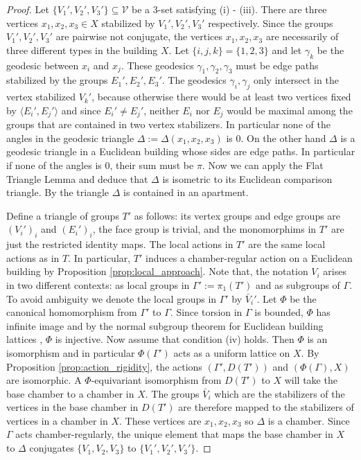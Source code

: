 \documentclass[dvipsnames]{article}
\theoremstyle{definition}
\theoremstyle{remark}
\begin{document}
    \begin{proof}        
        Let $\{V_1', V_2', V_3'\} \subseteq \mathcal V$ be a 3-set satisfying (i) - (iii).
        There are three vertices $x_1, x_2, x_3 \in X$ stabilized by $V_1', V_2', V_3'$ respectively.
        Since the groups $V_1', V_2', V_3'$ are pairwise not conjugate, the vertices $x_1, x_2, x_3$ are necessarily of three different types in the building $X$.
        Let $\{i,j,k\} = \{1,2,3\}$ and let $\gamma_k$ be the geodesic between $x_i$ and $x_j$.
        These geodesics $\gamma_1, \gamma_2, \gamma_3$ must be edge paths stabilized by the groups $E_1', E_2', E_3'$.
        The geodesics $\gamma_i, \gamma_j$ only intersect in the vertex stabilized $V_k'$, because otherwise there would be at least two vertices fixed by $\langle E_i', E_j'\rangle$ and since $E_i' \neq E_j'$, neither $E_i$ nor $E_j$ would be maximal among the groups that are contained in two vertex stabilizers.
        In particular none of the angles in the geodesic triangle $\Delta := \Delta(x_1, x_2, x_3)$ is 0.
        On the other hand $\Delta$ is a geodesic triangle in a Euclidean building whose sides are edge paths. In particular if none of the angles is 0, their sum must be $\pi$. Now we can apply the Flat Triangle Lemma \cite[Proposition II.2.9]{BridsonHaefliger} and deduce that $\Delta$ is isometric to its Euclidean comparison triangle. By \cite[Theorem VI.7.2]{Brown} the triangle $\Delta$ is contained in an apartment.

        Define a triangle of groups $T'$ as follows: its vertex groups and edge groups are $(V_i')_i$ and $(E_i')_i$, the face group is trivial, and the monomorphims in $T'$ are just the restricted identity maps.
        The local actions in $T'$ are the same local actions as in $T$. In particular, $T'$ induces a chamber-regular action on a Euclidean building by Proposition \ref{prop:local_approach}.
        Note that, the notation $V_i$ arises in two different contexts: as local groups in $\Gamma':=\pi_1(T')$ and as subgroups of $\Gamma$. To avoid ambiguity we denote the local groups in $\Gamma'$ by $\bar V_i'$.
        Let $\Phi$ be the canonical homomorphism from $\Gamma'$ to $\Gamma$.
        Since torsion in $\Gamma$ is bounded, $\Phi$ has infinite image and by the normal subgroup theorem for Euclidean building lattices \cite{LecureuxWitzel}, $\Phi$ is injective.
        Now assume that condition (iv) holds. Then $\Phi$ is an isomorphism and in particular $\Phi(\Gamma')$ acts as a uniform lattice on $X$. By Proposition \ref{prop:action_rigidity}, the actions $(\Gamma', D(T'))$ and $(\Phi(\Gamma), X)$ are isomorphic. A $\Phi$-equivariant isomorphism from $D(T')$ to $X$ will take the base chamber to a chamber in $X$. The groups $\bar V_i$ which are the stabilizers of the vertices in the base chamber in $D(T')$ are therefore mapped to the stabilizers of vertices in a chamber in $X$. 
        These vertices are $x_1,x_2,x_3$ so $\Delta$ is a chamber.
        Since $\Gamma$ acts chamber-regularly, the unique element that maps the base chamber in $X$ to $\Delta$ conjugates $\{ V_1, V_2, V_3\}$ to $\{V_1', V_2', V_3'\}$.
    \end{proof}
    
\end{document}
